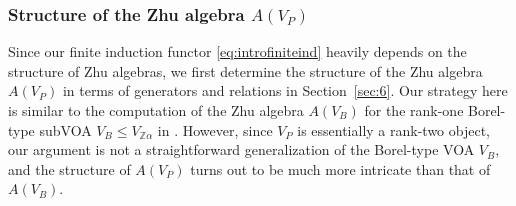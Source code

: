 \documentclass[12pt,a4paper,reqno]{amsart}
\numberwithin{equation}{section}
\numberwithin{equation}{section}
\theoremstyle{definition}
\newcommand{\Z}{\mathbb{Z}}
\def \C {\mathbb{C}}
\def \al{\alpha}
\def \b {\beta}
\def \op {\oplus}
\def \g {\mathfrak{g}}
\def \h {\mathfrak{h}}
\def\fn{\mathfrak{n}}
\begin{document}

\subsubsection{Structure of the Zhu algebra $A(V_P)$}

Since our finite induction functor \eqref{eq:introfiniteind} heavily depends on the structure of Zhu algebras, we first determine the structure of the Zhu algebra $A(V_P)$ in terms of generators and relations in Section~\ref{sec:6}. Our strategy here is similar to the computation of the Zhu algebra $A(V_B)$ for the rank-one Borel-type subVOA $V_B\leq V_{\Z\al}$ in \cite[Section~6]{Liu24}. However, since $V_P$ is essentially a rank-two object, our argument is not a straightforward generalization of the Borel-type VOA $V_B$, and the structure of $A(V_P)$ turns out to be much more intricate than that of $A(V_B)$. 
\end{document}
